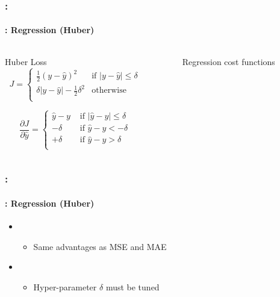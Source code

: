 \documentclass[xcolor=table]{beamer}
\begin{document}
\begin{frame}
	\frametitle{\insertshortsubtitle: \insertsection}
	\framesubtitle{\insertsubsection: Regression (Huber)}
	
	\begin{columns}
		\begin{column}{.68\linewidth}
			\begin{block}{Huber Loss}
				\[J = %
				\begin{cases}
					\frac{1}{2} (y - \hat{y})^2 & \text{if } |y - \hat{y}| \le \delta \\
					\delta |y - \hat{y}| - \frac{1}{2} \delta^2 & \text{otherwise }\\
				\end{cases}
				\]
				
				\[
				\frac{\partial J}{\partial \hat{y}} = 
				\begin{cases}
					\hat{y} - y & \text{ if } |\hat{y} - y| \le \delta \\
					-\delta & \text{ if } \hat{y} - y < -\delta \\
					+\delta & \text{ if } \hat{y} - y > \delta \\
				\end{cases}
				\]
				
			\end{block}
			
		\end{column}%
		\begin{column}{.3\linewidth}
			\begin{figure}
				\caption{Regression cost functions \cite{2017-rosenberg}}
			\end{figure}
		\end{column}
	\end{columns}

\end{frame}

\begin{frame}
	\frametitle{\insertshortsubtitle: \insertsection}
	\framesubtitle{\insertsubsection: Regression (Huber)}
	
	\begin{itemize}
		\item {}
		\begin{itemize}
			\item Same advantages as MSE and MAE
		\end{itemize}
		\item {}
		\begin{itemize}
			\item Hyper-parameter $\delta$ must be tuned
		\end{itemize}
	\end{itemize}

\end{frame}
\end{document}
